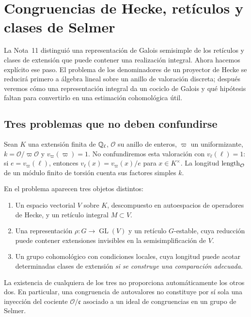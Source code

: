 \section{Congruencias de Hecke, retículos y clases de Selmer}
\label{sec:congruencias-selmer}

La Nota~11 distinguió una representación de Galois semisimple de los
retículos y clases de extensión que puede contener una realización
integral. Ahora hacemos explícito ese paso. El problema de los
denominadores de un proyector de Hecke se reducirá primero a álgebra
lineal sobre un anillo de valoración discreta; después veremos cómo
una representación integral da un cociclo de Galois y qué hipótesis
faltan para convertirlo en una estimación cohomológica útil.


\subsection{Tres problemas que no deben confundirse}

Sean $K$ una extensión finita de $\mathbb{Q}_\ell$, $\mathcal O$ su anillo
de enteros, $\varpi$ un uniformizante, $k=\mathcal O/\varpi\mathcal O$
y $v_\varpi(\varpi)=1$. No confundiremos esta valoración con
$v_\ell(\ell)=1$: si $e=v_\varpi(\ell)$, entonces
$v_\ell(x)=v_\varpi(x)/e$ para $x\in K^\times$.
La longitud $\operatorname{length}_{\mathcal O}$ de un módulo finito de torsión
cuenta sus factores simples $k$.

En el problema aparecen tres objetos distintos:
\begin{enumerate}
\item Un espacio vectorial $V$ sobre $K$, descompuesto en autoespacios
      de operadores de Hecke, y un retículo integral $M\subset V$.
\item Una representación $\rho:G\to\operatorname{GL}(V)$ y un
      retículo $G$-estable, cuya reducción puede contener extensiones
      invisibles en la semisimplificación de $V$.
\item Un grupo cohomológico con condiciones locales, cuya longitud
      puede acotar determinadas clases de extensión \emph{si se
      construye una comparación adecuada}.
\end{enumerate}
La existencia de cualquiera de los tres no proporciona
automáticamente los otros dos. En particular, una congruencia
de autovalores no constituye por sí sola una inyección del
cociente $\mathcal O/\mathfrak c$ asociado a un ideal de
congruencias en un grupo de Selmer.

